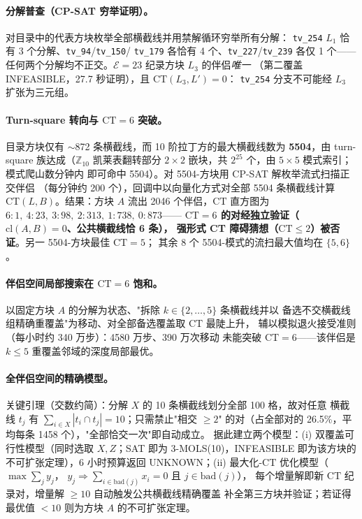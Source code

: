 \documentclass[11pt,a4paper]{ctexart}
\theoremstyle{remark}
\newcommand{\CT}{\mathrm{CT}}
\newcommand{\cl}{\mathrm{cl}}
\newcommand{\E}{\mathcal{E}}
\begin{document}
\paragraph{分解普查（CP-SAT 穷举证明）。}
对目录中的代表方块枚举全部横截线并用禁解循环穷举所有分解：
\texttt{tv\_254} $L_1$ 恰有 3 个分解、\texttt{tv\_94}/\texttt{tv\_150}/%
\texttt{tv\_179} 各恰有 4 个、\texttt{tv\_227}/\texttt{tv\_239} 各仅 1 个——
任何两个分解均不正交。$\E=23$ 纪录方块 $L_3$ 的伴侣\emph{唯一}
（第二覆盖 INFEASIBLE，27.7 秒证明），且 $\CT(L_3,L')=0$：
\texttt{tv\_254} 分支不可能经 $L_3$ 扩张为三元组。

\paragraph{Turn-square 转向与 $\CT=6$ 突破。}
目录方块仅有 $\sim$872 条横截线，而 10 阶拉丁方的最大横截线数为
\textbf{5504}，由 turn-square 族达成（$\mathbb{Z}_{10}$ 凯莱表翻转部分
$2\times2$ 嵌块，共 $2^{25}$ 个，由 $5\times5$ 模式索引；模式爬山数分钟内
即可命中 5504）。对 5504-方块用 CP-SAT 解枚举流式扫描正交伴侣
（每分钟约 200 个），回调中以向量化方式对全部 5504 条横截线计算
$\CT(L,B)$。结果：方块 $A$ 流出 2046 个伴侣，$\CT$ 直方图为
$6{:}1,\ 4{:}23,\ 3{:}98,\ 2{:}313,\ 1{:}738,\ 0{:}873$——
\textbf{$\CT=6$ 的对经独立验证（$\cl(A,B)=0$、公共横截线恰 6 条），
强形式 CT 障碍猜想（$\CT\le2$）被否证}。另一 5504-方块最佳 $\CT=5$；
其余 8 个 5504-模式的流扫最大值均在 $\{5,6\}$。

\paragraph{伴侣空间局部搜索在 $\CT=6$ 饱和。}
以固定方块 $A$ 的分解为状态、"拆除 $k\in\{2,\dots,5\}$ 条横截线并以
备选不交横截线组精确重覆盖"为移动、对全部备选覆盖取 $\CT$ 最陡上升，
辅以模拟退火接受准则（每小时约 340 万步）：4580 万步、390 万次移动
未能突破 $\CT=6$——该伴侣是 $k\le5$ 重覆盖邻域的深度局部最优。

\paragraph{全伴侣空间的精确模型。}
关键引理（交数约简）：分解 $X$ 的 10 条横截线划分全部 100 格，故对任意
横截线 $t_j$ 有 $\sum_{i\in X}|t_i\cap t_j|=10$；只需禁止"相交 $\ge2$"
的对（占全部对的 26.5\%，平均每条 1458 个），"全部恰交一次"即自动成立。
据此建立两个模型：(i) 双覆盖可行性模型（同时选取 $X,Z$；SAT 即为
3-MOLS(10)，INFEASIBLE 即为该方块的不可扩张定理），6 小时预算返回
UNKNOWN；(ii) 最大化-$\CT$ 优化模型（$\max\sum_j y_j$，
$y_j \Rightarrow \sum_{i\in\mathrm{bad}(j)}x_i=0$ 且 $j\in\mathrm{bad}(j)$），
每个增量解即新 $\CT$ 纪录对，增量解 $\ge10$ 自动触发公共横截线精确覆盖
补全第三方块并验证；若证得最优值 $<10$ 则为方块 $A$ 的不可扩张定理。
\end{document}
